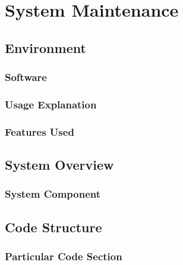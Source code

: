 \chapter{System Maintenance}

\section{Environment}

\subsection{Software}

\subsection{Usage Explanation}

\subsection{Features Used}

\section{System Overview}

\subsection{System Component}

\section{Code Structure}

\subsection{Particular Code Section}
\begin{comment}
\begin{figure}[H]
    \pythonfile[firstline=5,lastline=10]{./tex/function_programs/print_function.py}
    \caption{The print() function} \label{fig:print_function}
\end{figure}
\end{comment}

